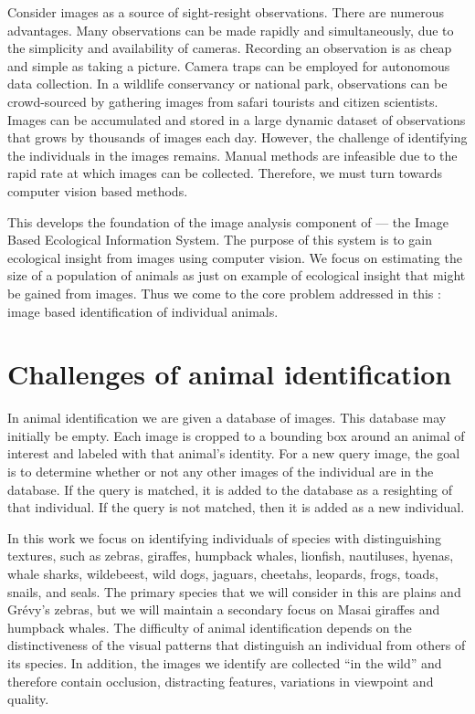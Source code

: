     Consider images as a source of sight-resight observations. There are numerous advantages. Many observations can be
    made rapidly and simultaneously, due to the simplicity and availability of cameras. Recording an observation is as
    cheap and simple as taking a picture. Camera traps can be employed for autonomous data collection. In a wildlife
    conservancy or national park, observations can be crowd-sourced by gathering images from safari tourists and citizen
    scientists. Images can be accumulated and stored in a large dynamic dataset of observations that grows by thousands
    of images each day. However, the challenge of identifying the individuals in the images remains. Manual methods are
    infeasible due to the rapid rate at which images can be collected. Therefore, we must turn towards computer vision
    based methods.

    This \thesis{} develops the foundation of the image analysis component of \IBEIS{} --- the Image Based Ecological
    Information System. The purpose of this system is to gain ecological insight from images using computer vision. We
    focus on estimating the size of a population of animals as just on example of ecological insight that might be
    gained from images. Thus we come to the core problem addressed in this \thesis{}: image based identification of
    individual animals.

\section{Challenges of animal identification}\label{sec:challenges}

    In animal identification we are given a database of images. This database may initially be empty. Each image is
    cropped to a bounding box around an animal of interest and labeled with that animal's identity. For a new query
    image, the goal is to determine whether or not any other images of the individual are in the database. If the query
    is matched, it is added to the database as a resighting of that individual. If the query is not matched, then it is
    added as a new individual.

    In this work we focus on identifying individuals of species with distinguishing textures, such as zebras,
    giraffes, humpback whales, lionfish, nautiluses, hyenas, whale sharks, wildebeest, wild dogs, jaguars,
    cheetahs, leopards, frogs, toads, snails, and seals. The primary species that we will consider in this
    \thesis{} are plains and Grévy's zebras, but we will maintain a secondary focus on Masai giraffes and humpback
    whales. The difficulty of animal identification depends on the distinctiveness of the visual patterns that
    distinguish an individual from others of its species. In addition, the images we identify are collected ``in
    the wild'' and therefore contain occlusion, distracting features, variations in viewpoint and quality.

